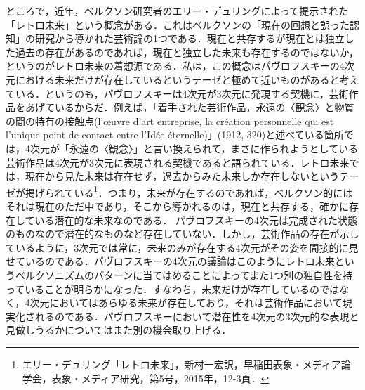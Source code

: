 ところで，近年，ベルクソン研究者のエリー・デュリングによって提示された「レトロ未来」という概念がある．これはベルクソンの「現在の回想と誤った認知」の研究から導かれた芸術論の1つである．現在と共存するが現在とは独立した過去の存在があるのであれば，現在と独立した未来も存在するのではないか，というのがレトロ未来の着想源である．私は，この概念はパヴロフスキーの4次元における未来だけが存在しているというテーゼと極めて近いものがあると考えている．というのも，パヴロフスキーは4次元が3次元に発現する契機に，芸術作品をあげているからだ．例えば，「着手された芸術作品，永遠の〈観念〉と物質の間の特有の接触点(l'œuvre d'art entreprise, la création personnelle qui est l'unique point de contact entre l'Idée éternelle)」(1912, 320)と述べている箇所では，4次元が「永遠の〈観念〉」と言い換えられて，まさに作られようとしている芸術作品は4次元が3次元に表現される契機であると語られている．レトロ未来では，現在から見た未来は存在せず，過去からみた未来しか存在しないというテーゼが掲げられている\footnote{エリー・デュリング「レトロ未来」，新村一宏訳，早稲田表象・メディア論学会，表象・メディア研究，第5号，2015年，12-3頁．}．つまり，未来が存在するのであれば，ベルクソン的にはそれは現在のただ中であり，そこから導かれるのは，現在と共存する，確かに存在している潜在的な未来なのである． パヴロフスキーの4次元は完成された状態のものなので潜在的なものなど存在していない．しかし，芸術作品の存在が示しているように，3次元では常に，未来のみが存在する4次元がその姿を間接的に見せているのである．パヴロフスキーの4次元の議論はこのようにレトロ未来というベルクソニズムのパターンに当てはめることによってまた1つ別の独自性を持っていることが明らかになった．すなわち，未来だけが存在しているのではなく，4次元においてはあらゆる未来が存在しており，それは芸術作品において現実化されるのである．パヴロフスキーにおいて潜在性を4次元の3次元的な表現と見做しうるかについてはまた別の機会取り上げる．



\begin{comment}
  
パヴロフスキーの4次元に関する理解が極めて特殊なのは，過去は存在せず未来だけが存在しているというその考えにある．

パヴロフスキーはクラインの壺のことを引用している．2次元多様体で，ユークリッド空間に埋め込むために4次元で曲率０とする5次元が必要となる．．また，結び目だけに注目しているのも興味深い．しかもdurerと言う言葉を使っているので完全に自分の解けてしまったリボンの文脈に繋げてしまっている．
\end{comment}


